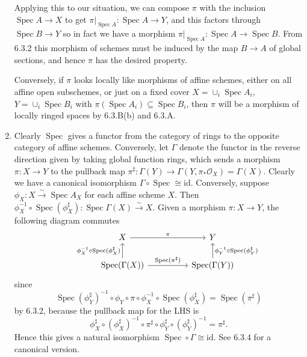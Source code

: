 \documentclass{report}
\newcommand{\id}{{\mathrm{id}}} %
\renewcommand{\O}{\mathscr{O}} %
\DeclareMathOperator{\Spec}{Spec}
\begin{document}
\begin{enumerate}[label=\textbf{6.3.\Alph*.}]
	      Applying this to our situation, we can compose $\pi$ with the inclusion
	      $\Spec A\to X$ to get $\pi|_{\Spec A}:\Spec A\to Y$, and this factors
	      through $\Spec B\to Y$ so in fact we have a morphism
	      $\pi|_{\Spec A}:\Spec A\to\Spec B$. From 6.3.2 this morphism of schemes
	      must be induced by the map $B\to A$ of global sections, and hence $\pi$
	      has the desired property.

	      Conversely, if $\pi$ looks locally like morphisms of affine schemes,
	      either on all affine open subschemes, or just on a fixed cover
	      $X=\cup_i\Spec A_i$, $Y=\cup_i\Spec B_i$ with
	      $\pi(\Spec A_i)\subseteq\Spec B_i$, then $\pi$ will be a morphism of
	      locally ringed spaces by 6.3.B(b) and 6.3.A.

	\item Clearly $\Spec$ gives a functor from the category of rings to the
	      opposite category of affine schemes. Conversely, let $\Gamma$ denote
	      the functor in the reverse direction given by taking global function
	      rings, which sends a morphism $\pi:X\to Y$ to the pullback map
	      $\pi^\sharp:\Gamma(Y)\to\Gamma(Y,\pi_*\O_X)=\Gamma(X)$. Clearly we
	      have a canonical isomorphism $\Gamma\circ\Spec\cong\id$. Conversely,
	      suppose $\phi_X:X\xrightarrow\sim\Spec A_X$ for each affine scheme
	      $X$. Then
	      $\phi_X^{-1}\circ\Spec(\phi_X^\sharp):\Spec\Gamma(X)\xrightarrow\sim X$.
	      Given a morphism $\pi:X\to Y$, the following diagram commutes
	      \begin{equation*}
		      \begin{tikzcd}[column sep=huge]
			      &X \arrow{r}{\pi}
			      &Y \\
			      &\Spec(\Gamma(X))
			      \arrow{r}{\Spec(\pi^\sharp)}
			      \arrow{u}{\phi_X^{-1}\circ\Spec(\phi_X^\sharp)}
			      &\Spec(\Gamma(Y))
			      \arrow[swap]{u}{\phi_Y^{-1}\circ\Spec(\phi_Y^\sharp)}
		      \end{tikzcd}
	      \end{equation*}
	      since
	      \begin{equation*}
		      \Spec(\phi_Y^\sharp)^{-1}\circ\phi_Y
		      \circ\pi\circ
		      \phi_X^{-1}\circ\Spec(\phi_X^\sharp) = \Spec(\pi^\sharp)
	      \end{equation*}
	      by 6.3.2, because the pullback map for the LHS is
	      \begin{equation*}
		      \phi_X^\sharp\circ(\phi_X^\sharp)^{-1}
		      \circ\pi^\sharp\circ
		      \phi_Y^\sharp\circ(\phi_Y^\sharp)^{-1} = \pi^\sharp.
	      \end{equation*}
	      Hence this gives a natural isomorphism $\Spec\circ\Gamma\cong\id$. See
	      6.3.4 for a canonical version.


\end{enumerate}
\end{document}
